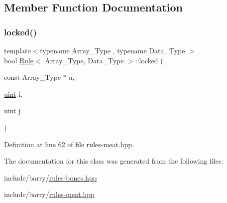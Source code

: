 \subsection{Member Function Documentation}
\mbox{\label{class_rule_a0a9a115c6951a5c8de699d4ff9f69060}} 
\subsubsection{\texorpdfstring{locked()}{locked()}}
{\footnotesize\ttfamily template$<$typename Array\+\_\+\+Type , typename Data\+\_\+\+Type $>$ \\
bool \hyperlink{class_rule}{Rule}$<$ Array\+\_\+\+Type, Data\+\_\+\+Type $>$\+::locked (\begin{DoxyParamCaption}\item[{const Array\+\_\+\+Type $\ast$}]{a,  }\item[{\hyperlink{typedefs_8hpp_a91ad9478d81a7aaf2593e8d9c3d06a14}{uint}}]{i,  }\item[{\hyperlink{typedefs_8hpp_a91ad9478d81a7aaf2593e8d9c3d06a14}{uint}}]{j }\end{DoxyParamCaption})\hspace{0.3cm}{\ttfamily [inline]}}



Definition at line 62 of file rules-\/meat.\+hpp.



The documentation for this class was generated from the following files\+:\begin{DoxyCompactItemize}
\item 
include/barry/\hyperlink{rules-bones_8hpp}{rules-\/bones.\+hpp}\item 
include/barry/\hyperlink{rules-meat_8hpp}{rules-\/meat.\+hpp}\end{DoxyCompactItemize}
